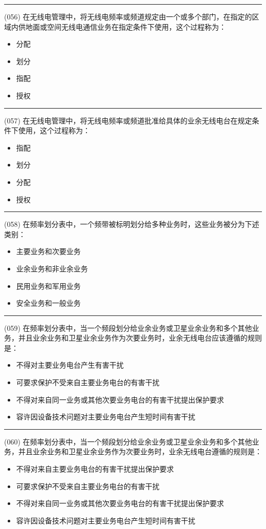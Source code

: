 \documentclass[twocolumn]{ctexart}  %
\begin{document}
\noindent\rule{0.5\textwidth}{1pt}
\heiti (056) 在无线电管理中，将无线电频率或频道规定由一个或多个部门，在指定的区域内供地面或空间无线电通信业务在指定条件下使用，这个过程称为： \songti {\color{gray} [LK0114] }
\begin{itemize}
	\item  分配
	\item  划分
	\item  指配
	\item  授权
\end{itemize}


\noindent\rule{0.5\textwidth}{1pt}
\heiti (057) 在无线电管理中，将无线电频率或频道批准给具体的业余无线电台在规定条件下使用，这个过程称为： \songti {\color{gray} [LK0115] }
\begin{itemize}
	\item  指配
	\item  划分
	\item  分配
	\item  授权
\end{itemize}


\noindent\rule{0.5\textwidth}{1pt}
\heiti (058) 在频率划分表中，一个频带被标明划分给多种业务时，这些业务被分为下述类别： \songti {\color{gray} [LK0140] }
\begin{itemize}
	\item  主要业务和次要业务
	\item  业余业务和非业余业务
	\item  民用业务和军用业务
	\item  安全业务和一般业务
\end{itemize}


\noindent\rule{0.5\textwidth}{1pt}
\heiti (059) 在频率划分表中，当一个频段划分给业余业务或卫星业余业务和多个其他业务，并且业余业务和卫星业余业务作为次要业务时，业余无线电台应该遵循的规则是： \songti {\color{gray} [LK0141] }
\begin{itemize}
	\item  不得对主要业务电台产生有害干扰
	\item  可要求保护不受来自主要业务电台的有害干扰
	\item  不得对来自同一业务或其他次要业务电台的有害干扰提出保护要求
	\item  容许因设备技术问题对主要业务电台产生短时间有害干扰
\end{itemize}


\noindent\rule{0.5\textwidth}{1pt}
\heiti (060) 在频率划分表中，当一个频段划分给业余业务或卫星业余业务和多个其他业务，并且业余业务和卫星业余业务作为次要业务时，业余无线电台遵循的规则是： \songti {\color{gray} [LK0142] }
\begin{itemize}
	\item  不得对来自主要业务电台的有害干扰提出保护要求
	\item  可要求保护不受来自主要业务电台的有害干扰
	\item  不得对来自同一业务或其他次要业务电台的有害干扰提出保护要求
	\item  容许因设备技术问题对主要业务电台产生短时间有害干扰
\end{itemize}
\end{document}
